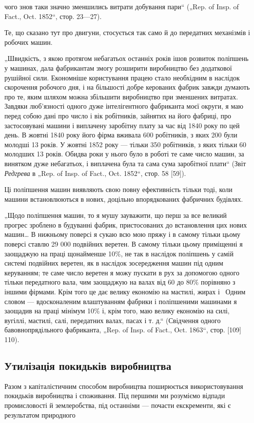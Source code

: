 \parcont{}  %
чого знов таки значно зменшились витрати добування пари“
(„Rep. of Insp. of Fact., Oct. 1852“, стор. 23—27).

Те, що сказано тут про двигуни, стосується так само й до
передатних механізмів і робочих машин.

„Швидкість, з якою протягом небагатьох останніх років
ішов розвиток поліпшень у машинах, дала фабрикантам змогу
розширити виробництво без додаткової рушійної сили. Економніше користування працею стало необхідним
в наслідок скорочення робочого дня, і на більшості добре керованих фабрик завжди думають про те,
яким шляхом можна збільшити
виробництво при зменшених витратах. Завдяки люб’язності одного
дуже інтелігентного фабриканта моєї округи, я маю перед собою дані про число і вік робітників,
зайнятих на його фабриці,
про застосовувані машини і виплачену заробітну плату за час
від 1840 року по цей день. В жовтні 1840 року його фірма
вживала 600 робітників, з яких 200 були молодші 13 років.
У жовтні 1852 року — тільки 350 робітників, з яких тільки 60
молодших 13 років. Обидва роки у нього було в роботі те саме
число машин, за винятком дуже небагатьох, і виплачена була та
сама сума заробітної плати“ (Звіт \emph{Редгрева} в „Rep. of Insp. of
Fact., Oct. 1852“, стор. 58 [59]).

Ці поліпшення машин виявляють свою повну ефективність
тільки тоді, коли машини встановлюються в нових, доцільно
впорядкованих фабричних будівлях.

„Щодо поліпшення машин, то я мушу зауважити, що перш
за все великий прогрес зроблено в будуванні фабрик, пристосованих до встановлення цих нових машин\dots{}
В нижньому поверсі
я сукаю всю мою пряжу і в самому тільки цьому поверсі
ставлю 29 000 подвійних веретен. В самому тільки цьому приміщенні я заощаджую на праці щонайменше
10\%, не так в наслідок поліпшень у самій системі подвійних веретен, як в наслідок зосередження машин
під одним керуванням; те саме число
веретен я можу пускати в рух за допомогою одного тільки
передатного вала, чим заощаджую на валах від 60 до 80\% порівняно з іншими фірмами. Крім того це дає
велику економію
на мастилі, жирах і~ Одним словом — вдосконаленим
влаштуванням фабрики і поліпшеними машинами я заощадив на
праці мінімум 10\% і, крім того, маю велику економію на силі,
вугіллі, мастилі, салі, передатних валах, пасах і т. д.“ (Свідчення
одного бавовнопрядільного фабриканта, „Rep. of Insp. of Fact.,
Oct. 1863“, стор. [109] 110).

\subsection{Утилізація покидьків виробництва}

Разом з капіталістичним способом виробництва поширюється
використовування покидьків виробництва і споживання. Під першими ми розуміємо відпади промисловості
й землеробства, під
останніми — почасти екскременти, які є результатом природного
\parbreak{}  %

